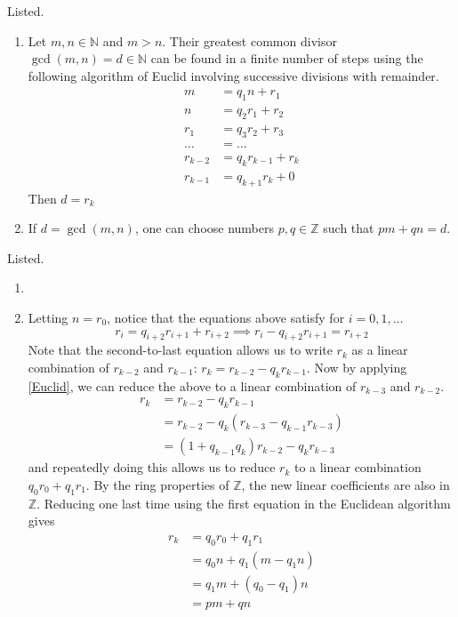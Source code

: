   \begin{exercise}[Zorich 2.2.5]
    Listed. 
    \begin{enumerate}
      \item Let $m, n \in \mathbb{N}$ and $m >n$. Their greatest common divisor $\gcd(m, n) = d \in \mathbb{N}$ can be found in a finite number of steps using the following algorithm of Euclid involving successive divisions with remainder. 
      \begin{align*}
        m & = q_1 n + r_1 \\
        n & = q_2 r_1 + r_2 \\
        r_1 & = q_3 r_2 + r_3 \\
        \ldots & = \ldots \\
        r_{k-2} & = q_{k} r_{k-1} + r_{k} \\
        r_{k-1} & = q_{k+1} r_k + 0
      \end{align*}
      Then $d=r_k$ 
      \item If $d = \gcd(m, n)$, one can choose numbers $p, q \in \mathbb{Z}$ such that $pm + qn = d$. 
    \end{enumerate}
  \end{exercise}
  \begin{solution}
    Listed. 
    \begin{enumerate}
      \item 
      \item Letting $n = r_0$, notice that the equations above satisfy for $i=0, 1, \ldots$
      \begin{equation}
        r_i = q_{i+2} r_{i+1} + r_{i+2} \implies r_{i} - q_{i+2} r_{i+1} = r_{i+2} \tag{1} \label{Euclid}
      \end{equation}
      Note that the second-to-last equation allows us to write $r_k$ as a linear combination of $r_{k-2}$ and $r_{k-1}$: $r_k = r_{k-2} - q_k r_{k-1}$. Now by applying \eqref{Euclid}, we can reduce the above to a linear combination of $r_{k-3}$ and $r_{k-2}$. 
      \begin{align*}
        r_k & = r_{k-2} - q_k r_{k-1} \\
        & = r_{k-2} - q_k (r_{k-3} - q_{k-1} r_{k-3}) \\
        & = (1 + q_{k-1} q_k) r_{k-2} - q_k r_{k-3} 
      \end{align*}
      and repeatedly doing this allows us to reduce $r_k$ to a linear combination $q_0 r_0 + q_1 r_1$. By the ring properties of $\mathbb{Z}$, the new linear coefficients are also in $\mathbb{Z}$. Reducing one last time using the first equation in the Euclidean algorithm gives 
      \begin{align*}
        r_k & = q_0 r_0 + q_1 r_1 \\
        & = q_0 n + q_1 (m - q_1 n) \\
        & = q_1 m + (q_0 - q_1) n \\
        & = p m + q n 
      \end{align*}
    \end{enumerate}
  \end{solution}

